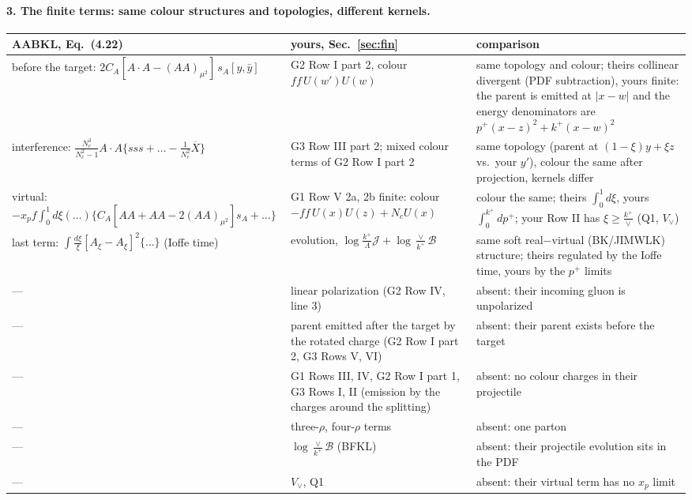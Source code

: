 \documentclass[9pt]{article}
\numberwithin{equation}{section}
\begin{document}
\paragraph{3. The finite terms: same colour structures and topologies, different kernels.}
{\small\renewcommand{\arraystretch}{1.25}
\begin{longtable}{@{}>{\raggedright\arraybackslash}p{}>{\raggedright\arraybackslash}p{}>{\raggedright\arraybackslash}p{}@{}}\hline
AABKL, Eq.~(4.22) & yours, Sec.~\ref{sec:fin} & comparison\\\hline\endhead
before the target: $2C_A[A\!\cdot\!A-(AA)_{\mu^2}]\,s_A[y,\bar y]$ & G2 Row I part 2, colour $f\!f\,U(w')U(w)$ & same topology and colour; theirs collinear divergent (PDF subtraction), yours finite: the parent is emitted at $|x-w|$ and the energy denominators are $p^+(x-z)^2+k^+(x-w)^2$\\
interference: $\frac{N_c^3}{N_c^2-1}A\!\cdot\!A\{sss+\dots-\frac{1}{N_c^2}\overline X\}$ & G3 Row III part 2; mixed colour terms of G2 Row I part 2 & same topology (parent at $(1-\xi)y+\xi z$ vs.\ your $y'$), colour the same after projection, kernels differ\\
virtual: $-x_pf\int_0^1d\xi(\dots)\{C_A[AA+AA-2(AA)_{\mu^2}]s_A+\dots\}$ & G1 Row V 2a, 2b finite: colour $-f\!f\,U(x)U(z)+N_cU(x)$ & colour the same; theirs $\int_0^1d\xi$, yours $\int_0^{k^+}dp^+$; your Row II has $\xi\ge\frac{k^+}{\vee}$ (Q1, $V_\vee$)\\
last term: $\int\frac{d\xi}{\xi}[A_\xi-A_\xi]^2\{\dots\}$ (Ioffe time) & evolution, $\log\frac{k^+}{\Lambda}\mathcal J+\log\frac{\vee}{k^+}\mathcal B$ & same soft real$-$virtual (BK/JIMWLK) structure; theirs regulated by the Ioffe time, yours by the $p^+$ limits\\
--- & linear polarization (G2 Row IV, line 3) & absent: their incoming gluon is unpolarized\\
--- & parent emitted after the target by the rotated charge (G2 Row I part 2, G3 Rows V, VI) & absent: their parent exists before the target\\
--- & G1 Rows III, IV, G2 Row I part 1, G3 Rows I, II (emission by the charges around the splitting) & absent: no colour charges in their projectile\\
--- & three-$\rho$, four-$\rho$ terms & absent: one parton\\
--- & $\log\frac{\vee}{k^+}\mathcal B$ (BFKL) & absent: their projectile evolution sits in the PDF\\
--- & $V_\vee$, Q1 & absent: their virtual term has no $x_p$ limit\\\hline
\end{longtable}}
\end{document}
